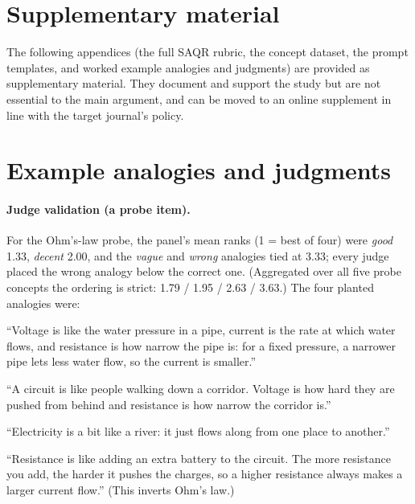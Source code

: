 \documentclass[11pt]{article}
\begin{document}



\appendix
\section*{Supplementary material}
\noindent The following appendices (the full SAQR rubric, the concept dataset, the prompt templates,
and worked example analogies and judgments) are provided as supplementary material. They document and
support the study but are not essential to the main argument, and can be moved to an online supplement
in line with the target journal's policy.



\section{Example analogies and judgments}
\label{app:examples}

\paragraph{Judge validation (a probe item).} For the Ohm's-law probe, the panel's mean ranks
(1 = best of four) were \emph{good} 1.33, \emph{decent} 2.00, and the \emph{vague} and
\emph{wrong} analogies tied at 3.33; every judge placed the wrong analogy below the correct
one. (Aggregated over all five probe concepts the ordering is strict: 1.79 / 1.95 / 2.63 /
3.63.) The four planted analogies were:
\begin{description}[leftmargin=0pt,itemsep=1pt]
  \item[\textnormal{\emph{good} (1.33):}] ``Voltage is like the water pressure in a pipe,
    current is the rate at which water flows, and resistance is how narrow the pipe is: for a
    fixed pressure, a narrower pipe lets less water flow, so the current is smaller.''
  \item[\textnormal{\emph{decent} (2.00):}] ``A circuit is like people walking down a
    corridor. Voltage is how hard they are pushed from behind and resistance is how narrow the
    corridor is.''
  \item[\textnormal{\emph{vague} (3.33):}] ``Electricity is a bit like a river: it just flows
    along from one place to another.''
  \item[\textnormal{\emph{wrong} (3.33):}] ``Resistance is like adding an extra battery to the
    circuit. The more resistance you add, the harder it pushes the charges, so a higher
    resistance always makes a larger current flow.'' (This inverts Ohm's law.)
\end{description}
\end{document}
